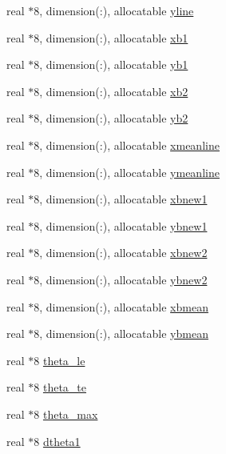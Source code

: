\begin{DoxyCompactItemize}
real $\ast$8, dimension(\+:), allocatable \hyperlink{namespacegridvar_a50e8fc927e6dd816267bc2eb8e20283f}{yline}
\item 
real $\ast$8, dimension(\+:), allocatable \hyperlink{namespacegridvar_ac19951c0ef8b36fd21139054f5e224e2}{xb1}
\item 
real $\ast$8, dimension(\+:), allocatable \hyperlink{namespacegridvar_a330cf63f1dec7b8eb31c4d643cfa9c07}{yb1}
\item 
real $\ast$8, dimension(\+:), allocatable \hyperlink{namespacegridvar_a66083c9a2a9d76f40ec6db31fe43e4aa}{xb2}
\item 
real $\ast$8, dimension(\+:), allocatable \hyperlink{namespacegridvar_af5cc21dee8d110e0ae7ce0e1370920cc}{yb2}
\item 
real $\ast$8, dimension(\+:), allocatable \hyperlink{namespacegridvar_ad19621a7f5affe93e33f8a58730527ca}{xmeanline}
\item 
real $\ast$8, dimension(\+:), allocatable \hyperlink{namespacegridvar_a7fb5eedd8e1bc9b66181f2cc2e461c0c}{ymeanline}
\item 
real $\ast$8, dimension(\+:), allocatable \hyperlink{namespacegridvar_a53c057251ce468ac480e633a8872773a}{xbnew1}
\item 
real $\ast$8, dimension(\+:), allocatable \hyperlink{namespacegridvar_a3f092d48897bcc3226b7c2fe84823bea}{ybnew1}
\item 
real $\ast$8, dimension(\+:), allocatable \hyperlink{namespacegridvar_af05e411d94cae29c5a5ac414c9d43621}{xbnew2}
\item 
real $\ast$8, dimension(\+:), allocatable \hyperlink{namespacegridvar_a8f285d1c92532af25a64aa36f934796e}{ybnew2}
\item 
real $\ast$8, dimension(\+:), allocatable \hyperlink{namespacegridvar_acee1a1e22370f51e5af53bda6cdececc}{xbmean}
\item 
real $\ast$8, dimension(\+:), allocatable \hyperlink{namespacegridvar_ae4e494722edb427de657fb301c02d39b}{ybmean}
\item 
real $\ast$8 \hyperlink{namespacegridvar_a2c69cc1685bd31d1e8722319a417957f}{theta\+\_\+le}
\item 
real $\ast$8 \hyperlink{namespacegridvar_a60dbce3589b06c139cdf4d3ea77ba514}{theta\+\_\+te}
\item 
real $\ast$8 \hyperlink{namespacegridvar_ac18957e46fd4763e6c2b1e08acc72714}{theta\+\_\+max}
\item 
real $\ast$8 \hyperlink{namespacegridvar_ae90ed2e3a99be8961302612c1df8c598}{dtheta1}
\item 

\end{DoxyCompactItemize}
